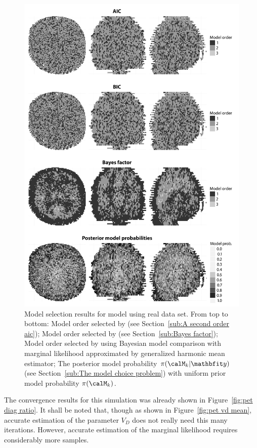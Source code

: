 \begin{figure}
  \includegraphics[width=\linewidth]{fig/PET_MO}
  \caption{Model selection results for \pet model using real data set. From
    top to bottom: Model order selected by \aicc (see Section~\ref{sub:A
      second order aic}); Model order selected by \bic (see
    Section~\ref{sub:Bayes factor}); Model order selected by using Bayesian
    model comparison with marginal likelihood approximated by generalized
    harmonic mean estimator; The posterior model probability
    $\pi(\calM_k|\data)$ (see Section~\ref{sub:The model choice problem}) with
    uniform prior model probability $\pi(\calM_k)$.}
  \label{fig:pet mo}
\end{figure}

The convergence results for this simulation was already shown in
Figure~\ref{fig:pet diag ratio}. It shall be noted that, though as shown in
Figure~\ref{fig:pet vd mean}, accurate estimation of the parameter $V_D$ does
not really need this many iterations. However, accurate estimation of the
marginal likelihood requires considerably more samples.


